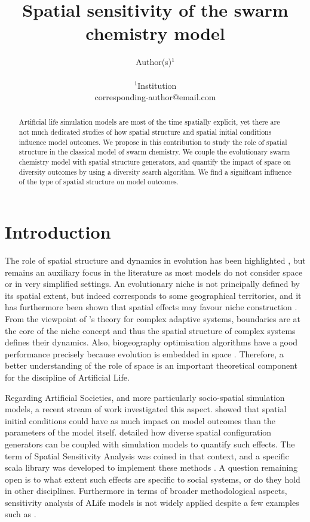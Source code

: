 \documentclass[letterpaper]{article}
\title{Spatial sensitivity of the swarm chemistry model}
\author{
    Author(s)$^{1}$\\
    \mbox{}\\
    $^1$Institution \\
    corresponding-author@email.com
} %
\begin{document}
\maketitle

\begin{abstract}
    Artificial life simulation models are most of the time spatially explicit, yet there are not much dedicated studies of how spatial structure and spatial initial conditions influence model outcomes. We propose in this contribution to study the role of spatial structure in the classical model of swarm chemistry. We couple the evolutionary swarm chemistry model with spatial structure generators, and quantify the impact of space on diversity outcomes by using a diversity search algorithm. We find a significant influence of the type of spatial structure on model outcomes.
\end{abstract}


\section{Introduction}

The role of spatial structure and dynamics in evolution has been highlighted \citep{lion2008self}, but remains an auxiliary focus in the literature as most models do not consider space or in very simplified settings. An evolutionary niche is not principally defined by its spatial extent, but indeed corresponds to some geographical territories, and it has furthermore been shown that spatial effects may favour niche construction \citep{silver2006spatial}. From the viewpoint of \cite{holland2012signals}'s theory for complex adaptive systems, boundaries are at the core of the niche concept and thus the spatial structure of complex systems defines their dynamics. Also, biogeography optimisation algorithms have a good performance precisely because evolution is embedded in space \citep{simon2008biogeography}. Therefore, a better understanding of the role of space is an important theoretical component for the discipline of Artificial Life.

Regarding Artificial Societies, and more particularly socio-spatial simulation models, a recent stream of work investigated this aspect. \cite{raimbault2019space} showed that spatial initial conditions could have as much impact on model outcomes than the parameters of the model itself. \cite{raimbault2023spatial} detailed how diverse spatial configuration generators can be coupled with simulation models to quantify such effects. The term of Spatial Sensitivity Analysis was coined in that context, and a specific scala library was developed to implement these methods \citep{raimbault2020scala}. A question remaining open is to what extent such effects are specific to social systems, or do they hold in other disciplines. Furthermore in terms of broader methodological aspects, sensitivity analysis of ALife models is not widely applied despite a few examples such as \citep{alden2014easing}.
\end{document}
